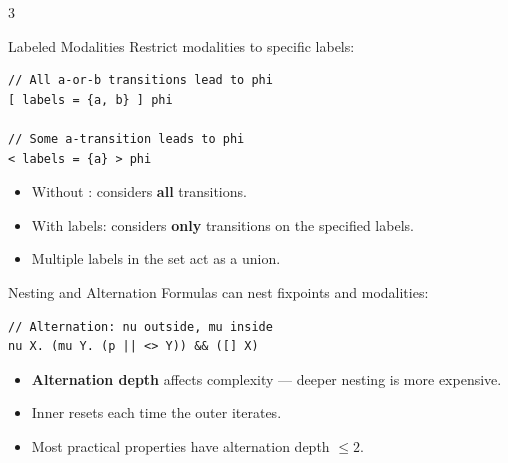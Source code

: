 \begin{multicols}{3}

\begin{cheatbox}{Labeled Modalities}
Restrict modalities to specific labels:
\begin{lstlisting}[style=ctxdsl]
// All a-or-b transitions lead to phi
[ labels = {a, b} ] phi

// Some a-transition leads to phi
< labels = {a} > phi
\end{lstlisting}

\begin{itemize}
  \item Without : considers \textbf{all} transitions.
  \item With labels: considers \textbf{only} transitions on the specified labels.
  \item Multiple labels in the set act as a union.
\end{itemize}
\end{cheatbox}

\begin{cheatbox}{Nesting and Alternation}
Formulas can nest fixpoints and modalities:
\begin{lstlisting}[style=ctxdsl]
// Alternation: nu outside, mu inside
nu X. (mu Y. (p || <> Y)) && ([] X)
\end{lstlisting}

\begin{itemize}
  \item \textbf{Alternation depth} affects complexity --- deeper nesting is more expensive.
  \item Inner  resets each time the outer  iterates.
  \item Most practical properties have alternation depth $\leq 2$.
\end{itemize}
\end{cheatbox}



\end{multicols}
